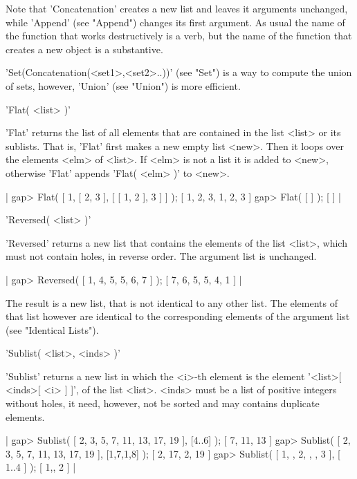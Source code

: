 Note that 'Concatenation'  creates a  new  list and  leaves it  arguments
unchanged, while 'Append' (see "Append")  changes its first argument.  As
usual the name of the  function that works destructively is  a verb,  but
the name of the function that creates a new object is a substantive.

'Set(Concatenation(<set1>,<set2>..))' (see "Set") is a way to compute the
union of sets, however, 'Union' (see "Union") is more efficient.


'Flat( <list> )'

'Flat' returns  the list of all  elements that are  contained in the list
<list> or its sublists.   That  is, 'Flat' first makes  a new empty  list
<new>.  Then it loops over the elements <elm> of <list>.  If <elm> is not
a list it is added to <new>, otherwise 'Flat' appends 'Flat( <elm>  )' to
<new>.

|    gap> Flat( [ 1, [ 2, 3 ], [ [ 1, 2 ], 3 ] ] );
    [ 1, 2, 3, 1, 2, 3 ]
    gap> Flat( [ ] );
    [  ] |

%

'Reversed( <list> )'

'Reversed'  returns a new  list  that contains the  elements of  the list
<list>, which must not  contain  holes, in  reverse order.  The  argument
list is unchanged.

|    gap> Reversed( [ 1, 4, 5, 5, 6, 7 ] );
    [ 7, 6, 5, 5, 4, 1 ] |

The result is a new list, that is  not identical to any  other list.  The
elements of that list however are identical to the corresponding elements
of the argument list (see "Identical Lists").


'Sublist( <list>, <inds> )'

'Sublist'  returns a new  list in which  the <i>-th element  is the element
'<list>[  <inds>[ <i> ]  ]', of the  list <list>. <inds>  must be a list of
positive  integers without holes,  it need, however,  not be sorted and may
contains duplicate elements.

|    gap> Sublist( [ 2, 3, 5, 7, 11, 13, 17, 19 ], [4..6] );
    [ 7, 11, 13 ]
    gap> Sublist( [ 2, 3, 5, 7, 11, 13, 17, 19 ], [1,7,1,8] );
    [ 2, 17, 2, 19 ]
    gap> Sublist( [ 1, , 2, , , 3 ], [ 1..4 ] );
    [ 1,, 2 ] |

